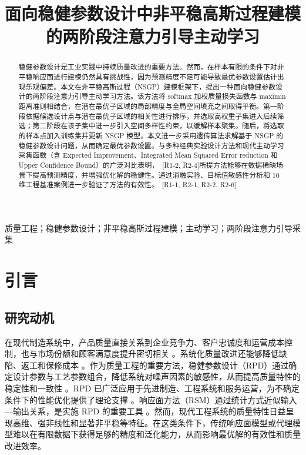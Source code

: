 \documentclass[]{interact}
\DeclareRobustCommand{\reviewadd}[2]{{\color{red}#1}\ {\color{blue}\footnotesize[#2]}}
\theoremstyle{plain}%
\theoremstyle{definition}
\theoremstyle{remark}
\begin{document}

\title{面向稳健参数设计中非平稳高斯过程建模的两阶段注意力引导主动学习}

\author{
}

\maketitle

\begin{abstract}
稳健参数设计是工业实践中持续质量改进的重要方法。然而，在样本有限的条件下对非平稳响应面进行建模仍然具有挑战性，因为预测精度不足可能导致最优参数设置估计出现乐观偏差。本文在非平稳高斯过程（NSGP）建模框架下，提出一种面向稳健参数设计的两阶段注意力引导主动学习方法。该方法将 softmax 加权质量损失函数与 maximin 距离准则相结合，在潜在最优子区域的局部精度与全局空间填充之间取得平衡。第一阶段依据候选设计点与潜在最优子区域的相关性进行排序，并选取高权重子集进入后续筛选；第二阶段在该子集中进一步引入空间多样性约束，以缓解样本聚集。随后，将选取的样本点加入训练集并更新 NSGP 模型。本文进一步采用遗传算法求解基于 NSGP 的稳健参数设计问题，从而确定最优参数设置。\reviewadd{与多种经典实验设计方法和现代主动学习采集函数（含 Expected Improvement、Integrated Mean Squared Error reduction 和 Upper Confidence Bound）的广泛对比表明，}{R1-2, R2-4}所提方法能够在数据稀缺场景下提高预测精度，并增强优化解的稳健性。\reviewadd{通过消融实验、目标值敏感性分析和 10 维工程基准案例进一步验证了方法的有效性。}{R1-1, R2-1, R2-2, R2-6}
\end{abstract}

\begin{keywords}
质量工程；稳健参数设计；非平稳高斯过程建模；主动学习；两阶段注意力引导采集
\end{keywords}


\section{引言}
\subsection{研究动机}
在现代制造系统中，产品质量直接关系到企业竞争力、客户忠诚度和运营成本控制，也与市场份额和顾客满意度提升密切相关 \citep{Wu2011, He2021, Liw2025}。系统化质量改进还能够降低缺陷、返工和保修成本 \citep{Wu2020}。作为质量工程的重要方法，稳健参数设计（RPD）通过确定设计参数与工艺参数组合，降低系统对噪声因素的敏感性，从而提高质量特性的稳定性和一致性 \citep{Bao2016, Ouyang2016, Ouyang2025}。RPD 已广泛应用于先进制造、工程系统和服务运营，为不确定条件下的性能优化提供了理论支撑 \citep{Chuang2017, An2020, Huang2022}。响应面方法（RSM）通过统计方式近似输入—输出关系，是实施 RPD 的重要工具 \citep{Fan2000, Ding2004, Peterson2009, Li2025}。然而，现代工程系统的质量特性日益呈现高维、强非线性和显著非平稳等特征。在这类条件下，传统响应面模型或代理模型难以在有限数据下获得足够的精度和泛化能力，从而影响最优解的有效性和质量改进效率。
\end{document}
